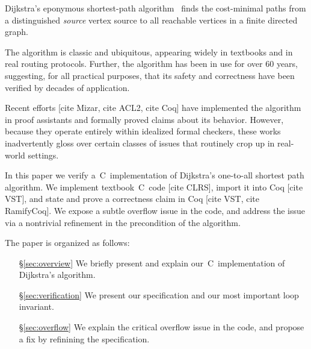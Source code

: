 Dijkstra's eponymous shortest-path algorithm~\cite{Dijk} finds
the cost-minimal paths from a distinguished \emph{source} vertex
source to all reachable vertices in a finite directed graph.

The algorithm is classic and ubiquitous, appearing widely in textbooks
and in real routing protocols. Further, the algorithm has been in
use for over $60$ years, suggesting, for all practical purposes,
that its safety and correctness have been verified by decades of application.

Recent efforts [cite Mizar, cite ACL2, cite Coq] have implemented the algorithm
in proof assistants and formally proved claims about its behavior.
However, because they operate entirely within idealized formal checkers,
these works inadvertently gloss over certain classes of issues
that routinely crop up in real-world settings.

In this paper we verify a~C~implementation of Dijkstra's
one-to-all shortest path algorithm. We implement
textbook~C~code [cite CLRS], import it into Coq [cite VST],
and state and prove a correctness claim in Coq [cite VST, cite RamifyCoq].
We expose a subtle overflow issue in the code, and address the issue
via a nontrivial refinement in the precondition of the algorithm.

The paper is organized as follows:
\vspace{-1em}
\begin{itemize}
    \item[\S\ref{sec:overview}] We briefly present and explain
    our~C~implementation of Dijkstra's algorithm.
    \item[\S\ref{sec:verification}] We present our specification
    and our most important loop invariant.
    \item[\S\ref{sec:overflow}] We explain the critical overflow issue
    in the code, and propose a fix by refinining the specification.
\end{itemize} 